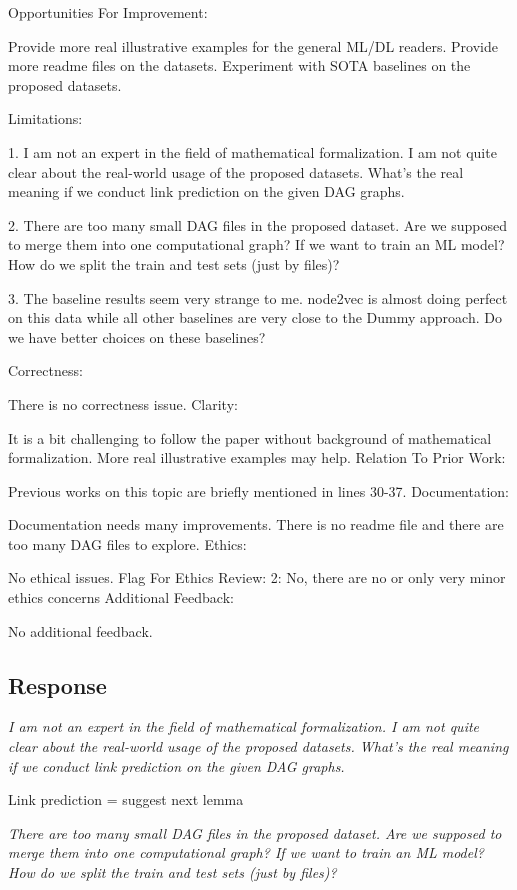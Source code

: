 \documentclass{article}
\begin{document}
Opportunities For Improvement:

    Provide more real illustrative examples for the general ML/DL readers.
    Provide more readme files on the datasets.
    Experiment with SOTA baselines on the proposed datasets.

Limitations:

   1. I am not an expert in the field of mathematical formalization. I am not quite clear about the real-world usage of the proposed datasets. What's the real meaning if we conduct link prediction on the given DAG graphs.

   2. There are too many small DAG files in the proposed dataset. Are we supposed to merge them into one computational graph? If we want to train an ML model? How do we split the train and test sets (just by files)?

   3. The baseline results seem very strange to me. node2vec is almost doing perfect on this data while all other baselines are very close to the Dummy approach. Do we have better choices on these baselines?

Correctness:

There is no correctness issue.
Clarity:

It is a bit challenging to follow the paper without background of mathematical formalization. More real illustrative examples may help.
Relation To Prior Work:

Previous works on this topic are briefly mentioned in lines 30-37.
Documentation:

Documentation needs many improvements. There is no readme file and there are too many DAG files to explore.
Ethics:

No ethical issues.
Flag For Ethics Review: 2: No, there are no or only very minor ethics concerns
Additional Feedback:

No additional feedback.
\subsection{Response}


\textit{I am not an expert in the field of mathematical formalization. I am not quite clear about the real-world usage of the proposed datasets. What's the real meaning if we conduct link prediction on the given DAG graphs.}

Link prediction = suggest next lemma

\textit{There are too many small DAG files in the proposed dataset. Are we supposed to merge them into one computational graph? If we want to train an ML model? How do we split the train and test sets (just by files)?
}
\end{document}
